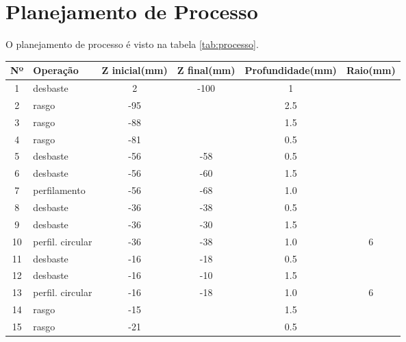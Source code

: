 \section{Planejamento de Processo}
O planejamento de processo é visto na tabela \ref{tab:processo}.
\begin{table*}[htp]
\centering
\begin{tabular}{|c|l|c|c|c|c|}\hline
Nº & Operação & Z inicial(mm) & Z final(mm) & Profundidade(mm) & Raio(mm) \\ \hline
 1& desbaste &2 & -100 & 1 & \\\hline
  2& rasgo & -95 & &2.5 & \\\hline
   3& rasgo &-88 & &1.5 & \\\hline
   4 & rasgo & -81 & &0.5 & \\\hline
5& desbaste & -56 & -58  & 0.5 & \\\hline
6& desbaste& -56 & -60  &1.5 & \\\hline
7& perfilamento & -56 & -68 & 1.0 & \\\hline
8& desbaste & -36 & -38  & 0.5 & \\\hline
9& desbaste& -36 & -30  &1.5 & \\\hline
10& perfil. circular & -36 & -38 & 1.0 & 6\\\hline
11& desbaste & -16 & -18  & 0.5 & \\\hline
12& desbaste& -16 & -10  &1.5 & \\\hline
13& perfil. circular & -16 & -18 & 1.0 & 6\\\hline
 14& rasgo &-15 & &1.5 & \\\hline
 15& rasgo & -21 & &0.5 & \\\hline
\end{tabular}
\caption{Planejamento de Processo}
\label{tab:processo}
\end{table*}
